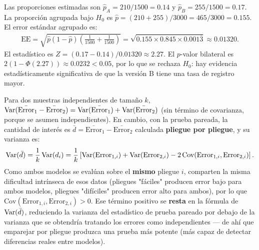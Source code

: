 \begin{solproblema}[prob:f78153c]
	Las proporciones estimadas son $\hat p_A = 210/1500 = 0.14$ y $\hat p_B = 255/1500 = 0.17$. La proporción agrupada bajo $H_0$ es $\hat p = (210+255)/3000 = 465/3000 = 0.155$. El error estándar agrupado es:
	\begin{align*}
		\text{EE} = \sqrt{\hat p(1-\hat p)\left(\frac{1}{1500}+\frac{1}{1500}\right)} = \sqrt{0.155\times0.845\times0.001\overline{3}} \approx 0.01320.
	\end{align*}
	El estadístico es $Z = (0.17-0.14)/0.01320 \approx 2.27$. El $p$-valor bilateral es $2(1-\Phi(2.27)) \approx 0.0232 < 0.05$, por lo que se rechaza $H_0$: hay evidencia estadísticamente significativa de que la versión B tiene una tasa de registro mayor.
\end{solproblema}

\begin{solproblema}
	Para dos muestras independientes de tamaño $k$, $\operatorname{Var}(\bar{\text{Error}}_1 - \bar{\text{Error}}_2) = \operatorname{Var}(\bar{\text{Error}}_1) + \operatorname{Var}(\bar{\text{Error}}_2)$ (sin término de covarianza, porque se asumen independientes). En cambio, con la prueba pareada, la cantidad de interés es $\bar d = \bar{\text{Error}}_1 - \bar{\text{Error}}_2$ calculada \textbf{pliegue por pliegue}, y su varianza es:
	\begin{align*}
		\operatorname{Var}(\bar d) = \frac{1}{k}\operatorname{Var}(d_i) = \frac{1}{k}\left[\operatorname{Var}(\text{Error}_{1,i}) + \operatorname{Var}(\text{Error}_{2,i}) - 2\,\text{Cov}(\text{Error}_{1,i},\text{Error}_{2,i})\right].
	\end{align*}
	Como ambos modelos se evalúan sobre el \textbf{mismo} pliegue $i$, comparten la misma dificultad intrínseca de esos datos (pliegues "fáciles" producen error bajo para ambos modelos, pliegues "difíciles" producen error alto para ambos), por lo que $\text{Cov}(\text{Error}_{1,i},\text{Error}_{2,i}) > 0$. Ese término positivo se \textbf{resta} en la fórmula de $\operatorname{Var}(\bar d)$, reduciendo la varianza del estadístico de prueba pareado por debajo de la varianza que se obtendría tratando los errores como independientes — de ahí que emparejar por pliegue produzca una prueba más potente (más capaz de detectar diferencias reales entre modelos).
\end{solproblema}


